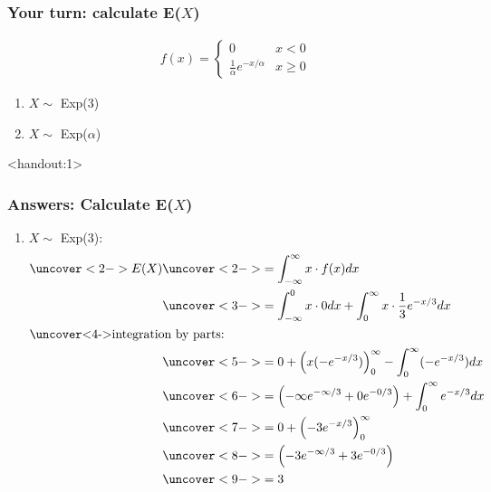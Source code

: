 \documentclass[handout]{beamer}\usepackage{graphicx, color}
\newcommand{\answers}{1}
\numberwithin{equation}{section}
\begin{document}
\begin{frame}
\frametitle{Your turn: calculate E($X$)}

\begin{align*}
f(x) = \begin{cases}
0 & x < 0 \\
\frac{1}{\alpha} e^{-x/\alpha} & x \ge 0
\end{cases}
\end{align*}

\begin{enumerate}[1. ]
\item $X \sim $ Exp(3)
\item $X \sim $ Exp($\alpha$)
\end{enumerate}
\end{frame}


\begin{frame}<handout:\answers>
\frametitle{Answers: Calculate E($X$)} \scriptsize

\begin{enumerate}[1. ]

\item $X \sim $ Exp(3):
\begin{align*}
\uncover<2->{E(X)} & \uncover<2->{= \int_{-\infty}^\infty x \cdot f(x) dx} \\
&\uncover<3->{= \int_{-\infty}^0 x \cdot 0 dx + \int_{0}^\infty x \cdot \frac{1}{3} e^{-x/3} dx} \\
\intertext{\uncover<4->{integration by parts:}}
&\uncover<5->{=0 + \left (  x (-e^{-x/3})  \right)_{0}^\infty - \int_{0}^\infty (-e^{-x/3}) dx} \\
&\uncover<6->{= \left ( -\infty e^{-\infty/3} + 0 e^{-0/3} \right ) + \int_0^\infty e^{-x/3} dx} \\
&\uncover<7->{= 0 + \left ( -3e^{-x/3} \right )_0^{\infty}} \\
&\uncover<8->{= \left (-3 e^{-\infty/3} + 3 e^{-0/3} \right )} \\
&\uncover<9->{= 3}
\end{align*}
\end{enumerate}
\end{frame}
\end{document}

